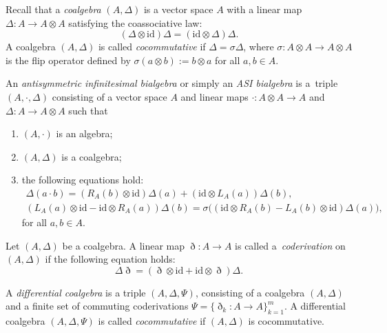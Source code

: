 \documentclass[pdftex]{sigma}
\numberwithin{equation}{section}
\newcommand{\id}{\mathrm{id}}
\begin{document}
Recall that a \textit{coalgebra} $(A, \Delta)$ is a vector space $A$ with a linear map $\Delta\colon A \to A \otimes A$ satisfying the coassociative law:
\begin{equation*}
 (\Delta \otimes \id)\Delta = (\id \otimes \Delta) \Delta.
\end{equation*}
A coalgebra $(A, \Delta)$ is called \textit{cocommutative}
if $\Delta = \sigma \Delta$,
where $\sigma\colon A \otimes A \to A \otimes A$ is the flip
operator defined by $\sigma(a \otimes b) := b \otimes a$ for all $a, b \in A$.

\begin{Definition}\label{def:asi_bialgebra}
An \textit{antisymmetric infinitesimal bialgebra} or simply an \textit{ASI bialgebra} is a~triple $(A, \cdot, \Delta)$ consisting of a vector space $A$ and linear maps $\cdot\colon A \otimes A \to A$ and $\Delta\colon A \to A \otimes A$ such that
 \begin{enumerate}\itemsep=0pt
 \item[(1)] $(A, \cdot)$ is an algebra;
 \item[(2)] $(A, \Delta)$ is a coalgebra;
 \item[(3)] the following equations hold:
 \begin{gather}
 \Delta(a \cdot b) = (R_A(b) \otimes \id )\Delta(a) + (\id \otimes L_A(a)) \Delta(b), \label{eq:asiifs} \\
 (L_A(a) \otimes \id - \id \otimes R_A(a))\Delta(b) = \sigma \big( (\id \otimes R_A(b) - L_A(b) \otimes \id )\Delta(a) \big), \label{eq:asisym}
 \end{gather}
 	for all $a, b \in A$.
 \end{enumerate}
\end{Definition}

\begin{Definition}\label{def:coderivation}
Let $(A, \Delta)$ be a coalgebra.
 A linear map $\eth\colon A \to A$ is called a~\textit{coderivation} on $(A, \Delta)$ if the following equation holds:
 \begin{equation}
 \Delta \eth = (\eth \otimes \id + \id \otimes \eth) \Delta. \label{eq:coderivation}
 \end{equation}
\end{Definition}

\begin{Definition}
 A \textit{differential coalgebra} is a triple $(A, \Delta, \Psi)$,
 consisting of a coalgebra $(A, \Delta)$ and a finite set of commuting coderivations $\Psi = \{\eth_k\colon A \to A\}_{k=1}^m$.
 A differential coalgebra $(A, \Delta, \Psi)$ is called \textit{cocommutative} if $(A, \Delta)$ is cocommutative.
\end{Definition}
\end{document}
